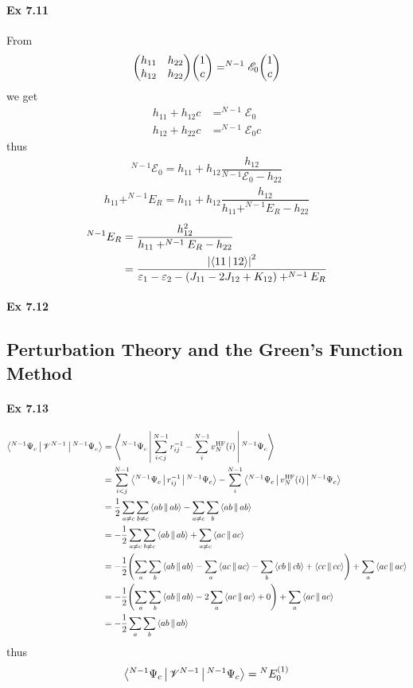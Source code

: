 \documentclass[a4paper]{article}
\newcommand{\ex}[1]{\paragraph{Ex #1}}
\numberwithin{equation}{subsection}
\begin{document}
\ex{7.11}
From
\begin{align}
\mqty(h_{11} & h_{22}\\ h_{12} & h_{22}) \mqty(1\\ c) = ^{N-1}\mathscr{E}_0 \mqty(1\\ c)
\end{align}
we get
\begin{align}
h_{11} + h_{12} c &= ^{N-1}\mathscr{E}_0 \\
h_{12} + h_{22} c &= ^{N-1}\mathscr{E}_0 c
\end{align}
thus
\begin{align}
^{N-1}\mathscr{E}_0 = h_{11} + h_{12}\dfrac{h_{12}}{^{N-1}\mathscr{E}_0 - h_{22}} 
\end{align}
\begin{align}
h_{11} + ^{N-1}E_R = h_{11} + h_{12}\dfrac{h_{12}}{h_{11} + ^{N-1}E_R - h_{22}} 
\end{align}
\begin{align}
^{N-1}E_R &= \dfrac{h_{12}^2}{h_{11} + ^{N-1}E_R - h_{22}} \notag\\
&= \dfrac{\abs{\Braket{11|12}}^2}{\varepsilon_1 - \varepsilon_2 - (J_{11} - 2J_{12} + K_{12}) + ^{N-1}E_R } 
\end{align}

\ex{7.12}









\subsection{Perturbation Theory and the Green's Function Method}
\ex{7.13}
\begin{align}
\Braket{^{N-1}\Psi_c | \mathscr{V}^{N-1} | ^{N-1}\Psi_c} &= \Braket{^{N-1}\Psi_c | \sum_{i<j}^{N-1} r_{ij}^{-1} - \sum_i^{N-1} v^{\text{HF}}_N(i) | ^{N-1}\Psi_c} \notag\\
&=  \sum_{i<j}^{N-1} \Braket{^{N-1}\Psi_c | r_{ij}^{-1} | ^{N-1}\Psi_c} 
- \sum_i^{N-1} \Braket{^{N-1}\Psi_c | v^{\text{HF}}_N(i) | ^{N-1}\Psi_c} \notag\\
&= \dfrac{1}{2}\sum_{a\neq c}\sum_{b\neq c} \Braket{ab||ab} - \sum_{a\neq c}\sum_{b} \Braket{ab||ab} \notag\\
&= -\dfrac{1}{2}\sum_{a\neq c}\sum_{b\neq c} \Braket{ab||ab} + \sum_{a\neq c} \Braket{ac||ac} \notag\\
&= -\dfrac{1}{2}\qty(\sum_{a}\sum_{b} \Braket{ab||ab} - \sum_a\Braket{ac||ac} - \sum_b\Braket{cb||cb} + \Braket{cc||cc}) + \sum_{a} \Braket{ac||ac}  \notag\\
&= -\dfrac{1}{2}\qty(\sum_{a}\sum_{b} \Braket{ab||ab} - 2\sum_a\Braket{ac||ac}  + 0) + \sum_{a} \Braket{ac||ac}  \notag\\
&= -\dfrac{1}{2}\sum_{a}\sum_{b} \Braket{ab||ab}
\end{align}
thus
\begin{equation}\label{key}
\Braket{^{N-1}\Psi_c | \mathscr{V}^{N-1} | ^{N-1}\Psi_c} = {^N}E_0^{(1)}
\end{equation}
\end{document}
